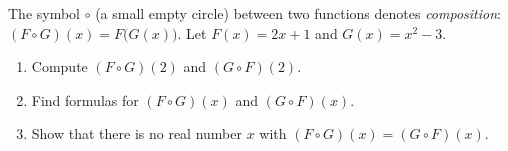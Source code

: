 The symbol $\circ$ (a small empty circle) between two functions denotes \emph{composition}: $(F\circ G)(x)=F\bigl(G(x)\bigr)$. Let $F(x)=2x+1$ and $G(x)=x^2-3$.
\begin{enumerate}
\item[(a)] Compute $(F\circ G)(2)$ and $(G\circ F)(2)$.
\item[(b)] Find formulas for $(F\circ G)(x)$ and $(G\circ F)(x)$.
\item[(c)] Show that there is no real number $x$ with $(F\circ G)(x)=(G\circ F)(x)$.
\end{enumerate}
